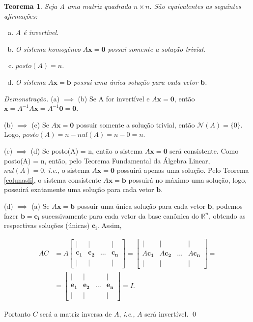 \documentclass[a4paper, 12pt]{article}
\newtheorem{teorema}{Teorema}
\theoremstyle{definition}
\newenvironment{demonstracao}{\noindent\textit{Demonstração.}}{\qed}
\theoremstyle{remark}
\begin{document}
\begin{teorema}
\label{matrizquadrada}
Seja A uma matriz quadrada $n \times n$. São equivalentes as seguintes afirmações:
\begin{enumerate}[a.]
    \item A é invertível.
    \item O sistema homogêneo $A\mathbf{x} = \mathbf{0}$ possui somente a solução trivial.
    \item $posto(A) = n$.
    \item O sistema $A\mathbf{x} = \mathbf{b}$ possui uma única solução para cada vetor $\mathbf{b}$.
\end{enumerate}
\end{teorema}

\begin{demonstracao}
(a) $\implies$ (b) Se A for invertível e $A\mathbf{x} = \mathbf{0}$, então $\mathbf{x} = A^{-1}A\mathbf{x} = A^{-1}\mathbf{0} = \mathbf{0}$.

(b) $\implies$ (c) Se $A\mathbf{x} = \mathbf{0}$ possuir somente a solução trivial, então $\mathcal{N}(A) = \{0\}$. Logo, $posto(A) = n - nul(A) = n - 0 = n$.

(c) $\implies$ (d) Se posto(A) = n, então o sistema $A\mathbf{x} = \mathbf{0}$ será consistente. Como posto(A) = n, então, pelo Teorema Fundamental da Álgebra Linear, $nul(A) = 0$, \textit{i.e.}, o sistema $A\mathbf{x} = \mathbf{0}$ possuirá apenas uma solução. Pelo Teorema \ref{colunasli}, o sistema consistente $A\mathbf{x} = \mathbf{b}$ possuirá no máximo uma solução, logo, possuirá exatamente uma solução para cada vetor $\mathbf{b}$.

(d) $\implies$ (a) Se $A\mathbf{x} = \mathbf{b}$ possuir uma única solução para cada vetor $\mathbf{b}$, podemos fazer $\mathbf{b} = \mathbf{e_i}$ sucessivamente para cada vetor da base canônica do $\mathbb{R}^n$, obtendo as respectivas soluções (únicas) $\mathbf{c_i}$. Assim,

\begin{align*}
AC &= A
\begin{bmatrix}
    \vert & \vert & \  & \vert \\
    \mathbf{c_1} & \mathbf{c_2} & \dots & \mathbf{c_n} \\
    \vert & \vert & \ & \vert
\end{bmatrix}
=
\begin{bmatrix}
    \vert & \vert & \  & \vert \\
    A\mathbf{c_1} & A\mathbf{c_2} & \dots & A\mathbf{c_n} \\
    \vert & \vert & \ & \vert
\end{bmatrix}
=\\
&=
\begin{bmatrix}
    \vert & \vert & \  & \vert \\
    \mathbf{e_1} & \mathbf{e_2} & \dots & \mathbf{e_n} \\
    \vert & \vert & \ & \vert
\end{bmatrix}
= I.
\end{align*}

Portanto $C$ será a matriz inversa de $A$, \textit{i.e.}, $A$ será invertível.
\end{demonstracao}\\
\end{document}
